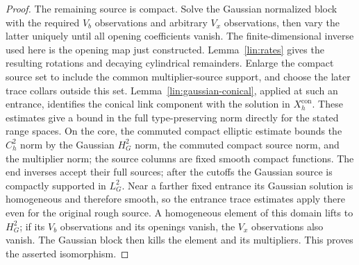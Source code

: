 \begin{proof}
The remaining source is compact.  Solve the Gaussian normalized block
with the required $V_b$ observations and arbitrary $V_x$ observations,
then vary the latter uniquely until all opening coefficients vanish.
The finite-dimensional inverse used here is the opening map just
constructed.  Lemma~\ref{lin:rates} gives the resulting rotations and
decaying cylindrical remainders.  Enlarge the compact source set to include
the common multiplier-source support, and choose the later trace collars
outside this set.  Lemma~\ref{lin:gaussian-conical}, applied
at such an entrance, identifies the
conical link component with the solution in $X^{\mathrm{con}}_h$.
These estimates give a bound in the full type-preserving norm directly
for the stated range spaces.  On the core, the commuted compact elliptic
estimate bounds the $C_h^2$ norm by the Gaussian $H^2_G$ norm, the
commuted compact source norm, and the multiplier norm; the source columns
are fixed smooth compact functions.  The end inverses accept their full sources;
after the cutoffs the Gaussian source is compactly supported in $L^2_G$.
Near a farther fixed entrance its Gaussian solution is homogeneous and
therefore smooth, so the entrance trace estimates apply there even for
the original rough source.  A homogeneous element of this
domain lifts to $H^2_G$; if its $V_b$ observations and its openings vanish,
the $V_x$ observations also vanish.  The Gaussian block then kills the
element and its multipliers.  This proves the asserted isomorphism.


\end{proof}
